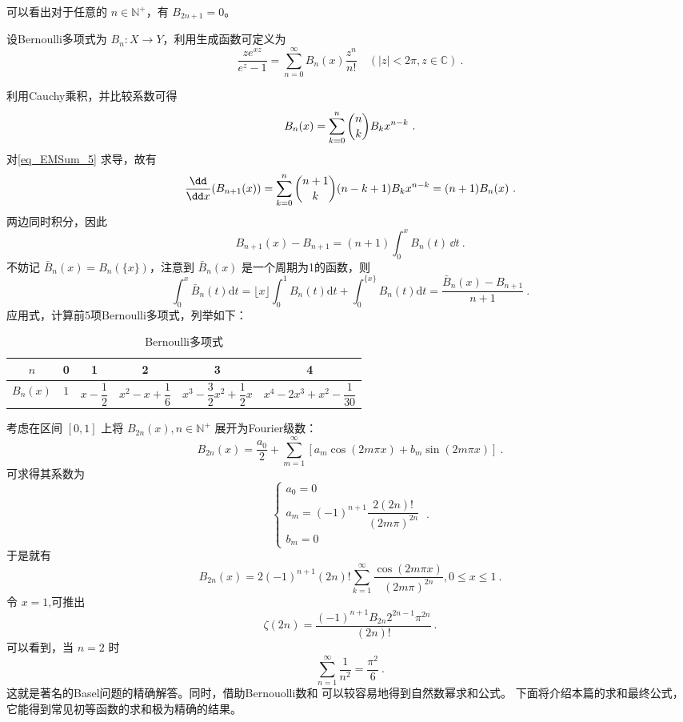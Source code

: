 可以看出对于任意的 $n\in\mathbb N^+$，有 $B_{2n+1}=0$。
\begin{definition}{}
设Bernoulli多项式为 $B_{n}:X\to Y$，利用生成函数可定义为
\begin{equation}{}
    \frac{ze^{xz}}{e^{z}-1}=\sum_{n=0}^{\infty}B_{n}(x)\frac{z^{n}}{n!}
    \quad(|z|<2\pi,z\in{\mathbb C})~.
\end{equation}	
\end{definition}
利用Cauchy乘积，并比较系数可得
\begin{equation}\label{eq_EMSum_5}
    B_{n}(x)=\sum_{k=0}^{n}\dbinom{n}{k}B_{k}x^{n-k}~.
\end{equation}
对\autoref{eq_EMSum_5} 求导，故有
\begin{equation}
    \frac{\dd}{\dd x}(B_{n+1}(x))=\sum_{k=0}^{n}\dbinom{n+1}{k}(n-k+1)B_{k}x^{n-k}=(n+1)B_{n}(x)~.
\end{equation}
两边同时积分，因此
\begin{equation}
    B_{n+1}(x)-B_{n+1}=(n+1)\int_{0}^{x}B_{n}(t)\,\dd t~.
\end{equation}
不妨记 $\bar{B}_{n}(x)=B_{n}(\{x\})$，注意到 $\bar{B}_{n}(x)$ 是一个周期为1的函数，则
\begin{equation}\label{eq_EMSum_6}
    \int_{0}^{x}\bar{B}_{n}(t)\mathrm{d}t
    =\lfloor x\rfloor\int_{0}^{1}B_{n}(t)\mathrm{d}t+\int_{0}^{\{x\}}B_{n}(t)\mathrm{d}t
    =\frac{\bar{B}_{n}(x)-B_{n+1}}{n+1}~.
\end{equation}
应用式，计算前5项Bernoulli多项式，列举如下：
\begin{table}[ht]
\centering
\caption{Bernoulli多项式}
\begin{tabular}{|c|c|c|c|c|c|}
\hline
$n$ & 0 & 1 & 2 & 3 & 4\\
\hline
$B_{n}(x)$ & $1$ & $x-\dfrac{1}{2}$ & $x^{2}-x+\dfrac{1}{6}$ & $x^{3}-\dfrac{3}{2}x^{2}+\dfrac{1}{2}x$ & $x^{4}-2x^{3}+x^{2}-\dfrac{1}{30}$\\
\hline
\end{tabular}
\end{table}
考虑在区间 $[0,1]$ 上将 $B_{2n}(x),n\in{\mathbb N^{+}}$ 展开为Fourier级数：
\[
    B_{2n}(x)=\frac{a_{0}}{2}+\sum_{m=1}^{\infty}[a_{m}\cos(2m\pi x)+b_{m}\sin(2m\pi x)]~.
\]
可求得其系数为
\begin{equation}
\begin{cases}
    a_{0}=0\\
    a_{m}=(-1)^{n+1}\dfrac{2(2n)!}{(2m\pi)^{2n}}\\
    b_{m}=0
\end{cases}~.
\end{equation}
于是就有
\begin{equation}
    B_{2n}(x)=2(-1)^{n+1}(2n)!\sum_{k=1}^{\infty}\frac{\cos(2m\pi x)}{(2m\pi)^{2n}},0\leqslant x\leqslant1~.
\end{equation}
令 $x=1$,可推出
\begin{equation}
    \zeta(2n)=\frac{(-1)^{n+1}B_{2n}2^{2n-1}\pi^{2n}}{(2n)!}~.
\end{equation}
可以看到，当 $n=2$ 时
\[
    \sum_{n=1}^{\infty}\frac{1}{n^2}=\frac{\pi^2}{6}~.
\]
这就是著名的Basel问题的精确解答。同时，借助Bernouolli数和 可以较容易地得到自然数幂求和公式。
下面将介绍本篇的求和最终公式，它能得到常见初等函数的求和极为精确的结果。

